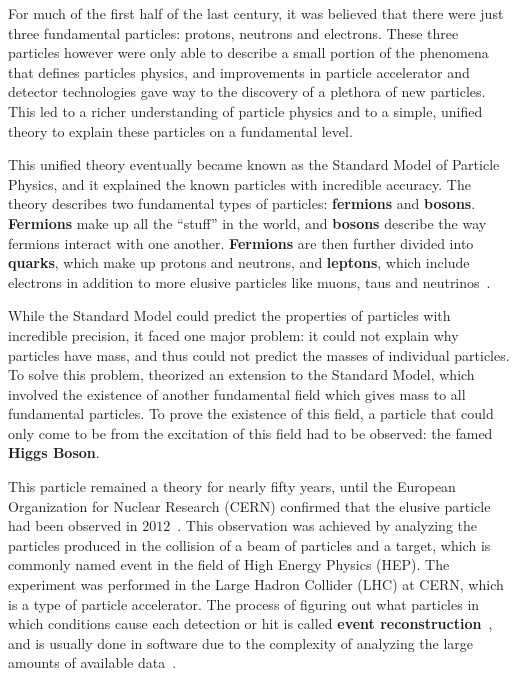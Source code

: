  \label{sec:intro}
For much of the first half of the last century, it was believed that there were just three fundamental particles: protons, neutrons and electrons.
These three particles however were only able to describe a small portion of the phenomena that defines particles physics, and improvements in particle accelerator and detector technologies gave way to the discovery of a plethora of new particles.
This led to a richer understanding of particle physics and to a simple, unified theory to explain these particles on a fundamental level.

This unified theory eventually became known as the Standard Model of Particle Physics, and it explained the known particles with incredible accuracy.
The theory describes two fundamental types of particles: \textbf{fermions} and \textbf{bosons}.
\textbf{Fermions} make up all the ``stuff'' in the world, and \textbf{bosons} describe the way fermions interact with one another.
\textbf{Fermions} are then further divided into \textbf{quarks}, which make up protons and neutrons, and \textbf{leptons}, which include electrons in addition to more elusive particles like muons, taus and neutrinos~\cite{perkins2000introduction}.

While the Standard Model could predict the properties of particles with incredible precision, it faced one major problem: it could not explain why particles have mass, and thus could not predict the masses of individual particles.
To solve this problem, \cite{higgs1964broken} theorized an extension to the Standard Model, which involved the existence of another fundamental field which gives mass to all fundamental particles.
To prove the existence of this field, a particle that could only come to be from the excitation of this field had to be observed: the famed \textbf{Higgs Boson}.

This particle remained a theory for nearly fifty years, until the European Organization for Nuclear Research (CERN) confirmed that the elusive particle had been observed in $2012$~\cite{aad2012observation, collaboration2008cms}.
This observation was achieved by analyzing the particles produced in the collision of a beam of particles and a target, which is commonly named event in the field of High Energy Physics (HEP).
The experiment was performed in the Large Hadron Collider (LHC) at CERN, which is a type of particle accelerator.
The process of figuring out what particles in which conditions cause each detection or hit is called \textbf{event reconstruction}~\cite{leduff2005longitudinal}, and is usually done in software due to the complexity of analyzing the large amounts of available data~\cite{demchenko2013addressing}.

